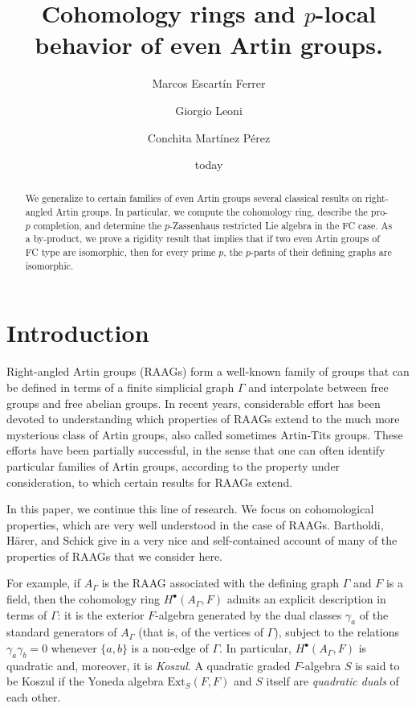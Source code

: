 \documentclass[10pt, oneside]{amsart}
\title[From RAAGs to Artin groups]{Cohomology rings and $p$-local behavior of even Artin groups.}
\author{Marcos Escartín Ferrer}
\author{Giorgio Leoni}
\author{Conchita Martínez Pérez}
\date{today}
\theoremstyle{definition}
\theoremstyle{remark}
\theoremstyle{plain}
\begin{document}
\begin{abstract} We generalize to certain families of even Artin groups several classical results on right-angled Artin groups. In particular, we compute the cohomology ring, describe the pro-$p$ completion, and determine the $p$-Zassenhaus restricted Lie algebra in the FC case. As a by-product, we prove a rigidity result that implies that if two even Artin groups of FC type are isomorphic, then for every prime $p$, the $p$-parts of their defining graphs are isomorphic.

\end{abstract}

\maketitle




\section{Introduction}\label{sec:introduction}

Right-angled Artin groups (RAAGs) form a well-known family of groups that can be defined in terms of a finite simplicial graph $\Gamma$ and interpolate between free groups and free abelian groups. In recent years, considerable effort has been devoted to understanding which properties of RAAGs extend to the much more mysterious class of Artin groups, also called sometimes Artin-Tits groups. These efforts have been partially successful, in the sense that one can often identify particular families of Artin groups, according to the property under consideration, to which certain results for RAAGs extend.

In this paper, we continue this line of research. We focus on cohomological properties, which are very well understood in the case of RAAGs. Bartholdi, Härer, and Schick give in \cite{BHS} a very nice and self-contained account of many of the properties of RAAGs that we consider here.

For example, if \(A_\Gamma\) is the RAAG associated with the defining graph \(\Gamma\) and \(F\) is a field, then the cohomology ring \(H^\bullet(A_\Gamma,F)\) admits an explicit description in terms of \(\Gamma\): it is the exterior \(F\)-algebra generated by the dual classes \(\gamma_a\) of the standard generators of \(A_\Gamma\) (that is, of the vertices of \(\Gamma\)), subject to the relations \(\gamma_a\gamma_b=0\) whenever \(\{a,b\}\) is a non-edge of \(\Gamma\). In particular, \(H^\bullet(A_\Gamma,F)\) is quadratic and, moreover, it is {\sl Koszul}. A quadratic graded \(F\)-algebra \(S\) is said to be Koszul if the Yoneda algebra \(\mathrm{Ext}_S(F,F)\) and \(S\) itself are {\sl quadratic duals} of each other.
\end{document}
